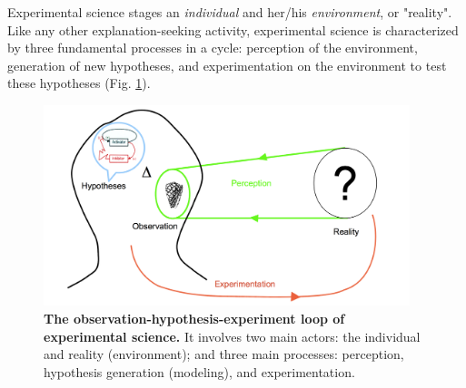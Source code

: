 Experimental science stages an \textit{individual} and her/his \textit{environment}, or "reality". Like any other explanation-seeking activity, experimental science is characterized by three fundamental processes in a cycle: perception of the environment, generation of new hypotheses, and experimentation on the environment to test these hypotheses (Fig. \ref{experimental_science_schematic}).
\begin{figure}
\begin{center}
\includegraphics[width=0.95\textwidth]{../../images/experimental_science/experimental_science_raw_v2.png}
\end{center}
\caption{\textbf{The observation-hypothesis-experiment loop of experimental science. } It involves two main actors: the individual and reality (environment); and three main processes: perception, hypothesis generation (modeling), and experimentation.}
\label{experimental_science_schematic}
\end{figure}
